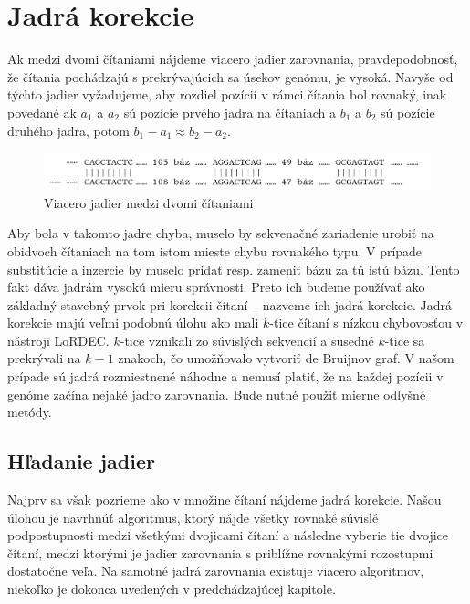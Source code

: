 \section{Jadrá korekcie}

Ak medzi dvomi čítaniami nájdeme viacero jadier zarovnania, pravdepodobnosť, že čítania pochádzajú s prekrývajúcich sa úsekov genómu, je vysoká. Navyše od týchto jadier vyžadujeme, aby rozdiel pozícií v rámci čítania bol rovnaký, inak povedané ak $a_{1}$ a $a_{2}$ sú pozície prvého jadra na čítaniach a $b_{1}$ a $b_{2}$ sú pozície druhého jadra, potom $b_{1} - a_{1} \approx b_{2} - a_{2}$.

\begin{figure}
    \centering
    \includegraphics[width=1\textwidth]{images/jadra_korekcie.png}
    \caption{Viacero jadier medzi dvomi čítaniami}
    \label{fig:jadra_korekcie}
\end{figure} 

Aby bola v takomto jadre chyba, muselo by sekvenačné zariadenie urobiť na obidvoch čítaniach na tom istom mieste chybu rovnakého typu. V prípade substitúcie a inzercie by muselo  pridať resp. zameniť bázu za tú istú bázu. Tento fakt dáva jadrám vysokú mieru správnosti. Preto ich budeme používať ako základný stavebný prvok pri korekcii čítaní -- nazveme ich jadrá korekcie. 
Jadrá korekcie majú veľmi podobnú úlohu ako mali $k$-tice čítaní s nízkou chybovosťou v nástroji LoRDEC. $k$-tice vznikali zo súvislých sekvencií a susedné $k$-tice sa prekrývali na $k - 1$ znakoch, čo umožňovalo vytvoriť de Bruijnov graf. V našom prípade sú jadrá rozmiestnené náhodne a nemusí platiť, že na každej pozícii v genóme začína nejaké jadro zarovnania. Bude nutné použiť mierne odlyšné metódy.

\subsection{Hľadanie jadier}

Najprv sa však pozrieme ako v množine čítaní nájdeme jadrá korekcie. Našou úlohou je navrhnúť algoritmus, ktorý nájde všetky rovnaké súvislé podpostupnosti medzi všetkými dvojicami čítaní a následne vyberie tie dvojice čítaní, medzi ktorými je jadier zarovnania s priblížne rovnakými rozostupmi dostatočne veľa. Na samotné jadrá zarovnania existuje viacero algoritmov, niekoľko je dokonca uvedených v predchádzajúcej kapitole.


